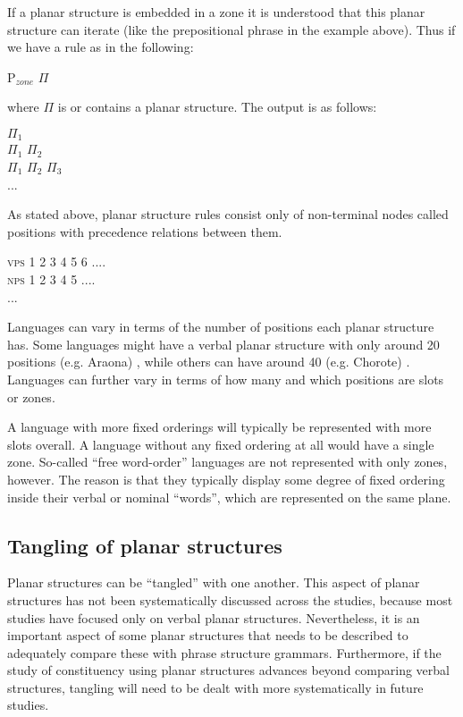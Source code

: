\documentclass[output=paper,hidelinks]{langscibook}
\begin{document}
If a planar structure is embedded in a zone it is understood that this planar structure can iterate (like the prepositional phrase in the example above). Thus if we have a rule as in the following:

\ea \label{embedding1}
        P$_{zone}$ \rightarrow {} $\Pi$ \\
\z 

where $\Pi$ is  or contains a planar structure. The output is as follows:

\ea \label{embedding2}
        \ea $\Pi_1$ \\
        \ex $\Pi_1$ $\Pi_2$ \\
        \ex $\Pi_1$ $\Pi_2$ $\Pi_3$ \\
        \ex ...
        \z 
\z 

As stated above, planar structure rules consist only of non-terminal nodes called positions with precedence relations between them.

\ea \label{}
    \ea \textsc{vps} \rightarrow{} 1 2 3 4 5 6 .... \\
    \ex \textsc{nps} \rightarrow{} 1 2 3 4 5  .... \\
    \ex ... \\
    \z 
\z

Languages can vary in terms of the number of positions each planar structure has. Some languages might have a verbal planar structure with only around 20 positions (e.g. Araona) , while others can have around 40 (e.g. Chorote) . Languages can further vary in terms of how many and which positions are slots or zones.

A language with more fixed orderings will typically be represented with more slots overall. A language without any fixed ordering at all would have a single zone. So-called ``free word-order'' languages are not represented with only zones, however. The reason is that they typically display some degree of fixed ordering inside their verbal or nominal ``words'', which are represented on the same plane.

\subsection{Tangling of planar structures}
\label{sec:tangling}
\largerpage[-1]
Planar structures can be ``tangled'' with one another. This aspect of planar structures has not been systematically discussed across the studies, because most studies have focused only on verbal planar structures. Nevertheless, it is an important aspect of some planar structures that needs to be described to adequately compare these with phrase structure grammars. Furthermore, if the study of constituency using planar structures advances beyond comparing verbal structures, tangling will need to be dealt with more systematically in future studies.
\end{document}
